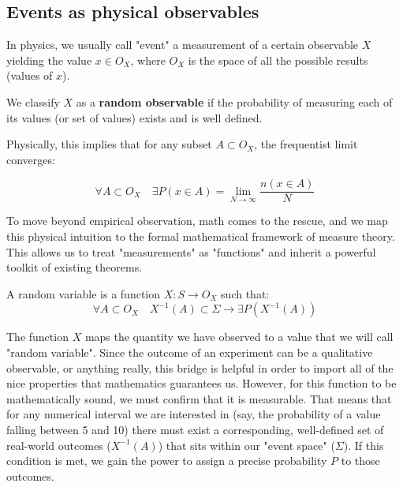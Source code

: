 \subsection{Events as physical observables}
\label{subsec:observables}

In physics, we usually call "event" a measurement of a certain observable $X$ yielding the value $x\in O_X$, where $O_X$ is the space of all the possible results (values of $x$). 


We classify $X$ as a \textbf{random observable} if the probability of measuring each of its values (or set of values) exists and is well defined. 

Physically, this implies that for any subset $A \subset O_X$, the frequentist limit converges:

	\[
	\forall A \subset O_X \quad \exists P(x\in A) = \lim_{N\to\infty}\frac{n(x\in A)}{N}
	\]


To move beyond empirical observation, math comes to the rescue, and we map this physical intuition to the formal mathematical framework of measure theory. This allows us to treat "measurements" as "functions" and inherit a powerful toolkit of existing theorems.

\begin{definition}
	A random variable is a function $X: S\rightarrow O_X$ such that:
	\[
	\forall A \subset O_X \quad X^{-1}(A)\subset \Sigma \rightarrow \exists P(X^{-1}(A))
	\]
\end{definition}


The function $X$  maps the quantity we have observed to a value that we will call "random variable". Since the outcome of an experiment can be a qualitative observable, or anything really, this bridge is helpful in order to import all of the nice properties that mathematics guarantees us. However, for this function to be mathematically sound, we must confirm that it is measurable. That means that for any numerical interval we are interested in (say, the probability of a value falling between 5 and 10) there must exist a corresponding, well-defined set of real-world outcomes ($X^{-1}(A)$) that sits within our "event space" ($\Sigma$). If this condition is met, we gain the power to assign a precise probability $P$ to those outcomes.

